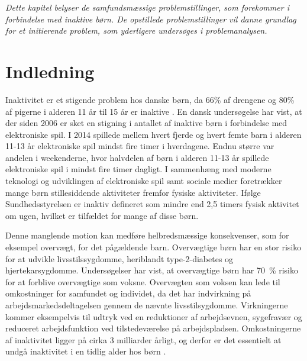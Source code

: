 \textit{Dette kapitel belyser de samfundsmæssige problemstillinger, som forekommer i forbindelse med inaktive børn. De opstillede problemstillinger vil danne grundlag for et initierende problem, som yderligere undersøges i problemanalysen.}

\section{Indledning}
Inaktivitet er et stigende problem hos danske børn, da 66\% af drengene og 80\% af pigerne i alderen 11 år til 15 år er inaktive \citep{SundhedsstyrrelsenFaktaark}. %
En dansk undersøgelse har vist, at der siden 2006 er sket en stigning i antallet af inaktive børn i forbindelse med elektroniske spil. I 2014 spillede mellem hvert fjerde og hvert femte barn i alderen 11-13 år elektroniske spil mindst fire timer i hverdagene. Endnu større var andelen i weekenderne, hvor halvdelen af børn i alderen 11-13 år spillede elektroniske spil i mindst fire timer dagligt. \citep{Universitet2014}  I sammenhæng med moderne teknologi og udviklingen af elektroniske spil samt sociale medier foretrækker mange børn stillesiddende aktiviteter fremfor fysiske aktiviteter. \citep{Universitet2014} Ifølge Sundhedsstyrelsen er inaktiv defineret som mindre end 2,5 timers fysisk aktivitet om ugen, hvilket er tilfældet for mange af disse børn.  \citep{Kiens2007}

Denne manglende motion kan medføre helbredsmæssige konsekvenser, som for eksempel overvægt, for det pågældende barn. Overvægtige børn har en stor risiko for at udvikle livsstilssygdomme, heriblandt type-2-diabetes og hjertekarsygdomme. Undersøgelser har vist, at overvægtige børn har 70~\% risiko for at forblive overvægtige som voksne. \citep{Reilly2006} 
Overvægten som voksen kan lede til omkostninger for samfundet og individet, da det har indvirkning på arbejdsmarkedsdeltagelsen gennem de nævnte livsstilsygdomme. Virkningerne kommer eksempelvis til udtryk ved en reduktioner af arbejdsevnen, sygefravær og reduceret arbejdsfunktion ved tilstedeværelse på arbejdspladsen. Omkostningerne af inaktivitet ligger på cirka 3 milliarder årligt, og derfor er det essentielt at undgå inaktivitet i en tidlig alder hos børn \citep{BarudThomsen2007, JuelSoerensenBroennum-Hansen2006}.

